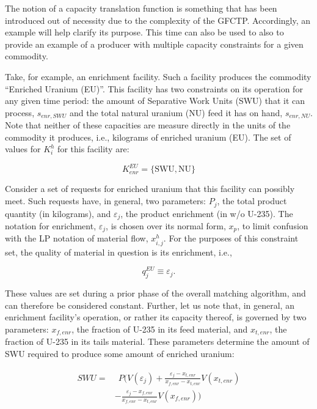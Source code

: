 The notion of a capacity translation function is something that has been
introduced out of necessity due to the complexity of the GFCTP. Accordingly, an
example will help clarify its purpose. This time can also be used to also to
provide an example of a producer with multiple capacity constraints for a given
commodity.

Take, for example, an enrichment facility. Such a facility produces the
commodity ``Enriched Uranium (EU)''. This facility has two constraints on its
operation for any given time period: the amount of Separative Work Units (SWU)
that it can process, $s_{enr,SWU}$ and the total natural uranium (NU) feed it
has on hand, $s_{enr,NU}$. Note that neither of these capacities are measure
directly in the units of the commodity it produces, i.e., kilograms of enriched
uranium (EU). The set of values for $K_{i}^{h}$ for this facility are:

\begin{equation}\label{eqs:enr-constr-commods}
  K_{enr}^{EU} = \{ \mbox{SWU}, \mbox{NU} \}
\end{equation}

Consider a set of requests for enriched uranium that this facility can possibly
meet. Such requests have, in general, two parameters: $P_{j}$, the total product
quantity (in kilograms), and $\varepsilon_{j}$, the product enrichment (in w/o
U-235). The notation for enrichment, $\varepsilon_{j}$, is chosen over its
normal form, $x_p$, to limit confusion with the LP notation of material flow,
$x^h_{i,j}$. For the purposes of this constraint set, the quality of material in
question is its enrichment, i.e.,

\begin{equation}\label{eqs:enr-q-swu}
  q_{j}^{EU} \equiv \varepsilon_{j}.
\end{equation}

These values are set during a prior phase of the overall matching algorithm, and
can therefore be considered constant. Further, let us note that, in general, an
enrichment facility's operation, or rather its capacity thereof, is governed by
two parameters: $x_{f,enr}$, the fraction of U-235 in its feed material, and
$x_{t,enr}$, the fraction of U-235 in its tails material. These parameters
determine the amount of SWU required to produce some amount of enriched uranium:

\begin{align}
\begin{split}
\label{eqs:swu}
SWU = & \:\: P ( V(\varepsilon_{j}) 
      + \frac{\varepsilon_{j} - x_{t,enr}}
               {x_{f,enr} - x_{t,enr}} V(x_{t,enr}) \\
      & - \frac{\varepsilon_{j} - x_{f,enr}}
               {x_{f,enr} - x_{t,enr}} V(x_{f,enr}) )
\end{split}
\end{align}


